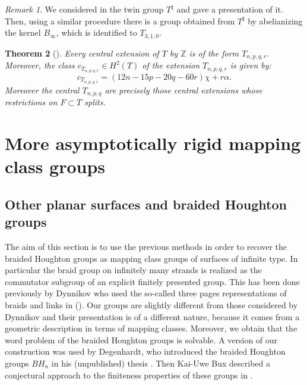 \documentclass[twoside]{irmaems}
\theoremstyle{plain}
\newtheorem{theorem}{Theorem}[section]
\theoremstyle{definition}
\theoremstyle{remark}
\newtheorem{remark}[theorem]{Remark}
\newcommand{\Z}{{\mathbb{Z}}}
\begin{document}
\begin{remark} 
We considered in \cite{fu-ka2} the twin group $T^{\sharp}$ 
and gave a presentation 
of it.  Then, using a similar procedure there is a group obtained from 
$T^{\sharp}$ 
by abelianizing the kernel $B_{\infty}$, which is identified  
to $T_{3,1,0}$. 
\end{remark}



\begin{theorem}[\cite{fu-se}]\label{exte0}
Every central extension of $T$ by $\Z$ is of the form $T_{n,p,q,r}$. Moreover,   
the class $c_{T_{n,p,q,r}}\in H^2(T)$ of the extension $T_{n,p,q,r}$  
is given by:  
\[ c_{T_{n,p,q,r}}= (12n-15p-20q-60r) \chi + r \alpha. \]
Moreover the central $T_{n,p,q}$ are precisely those central extensions 
whose restrictions on $F\subset T$ splits. 
\end{theorem}	




 
 






\section{More asymptotically rigid mapping class groups}

\subsection{Other planar surfaces and braided Houghton groups}
\vspace{0.2cm} 
\noindent 
The aim of this section is to use the previous methods  
in order to recover the braided Houghton groups as mapping class groups  
of surfaces of infinite type. In particular the braid group on infinitely 
many strands is realized as the commutator subgroup of an explicit 
finitely presented group. This has been done previously by Dynnikov  
who used the so-called three pages representations 
of braids and links in (\cite{Dy}). Our groups are slightly 
different from those considered by Dynnikov and their presentation is 
of a different nature, because it comes from a geometric description 
in terms of mapping classes. Moreover, we obtain that the word problem of the 
braided Houghton groups is solvable.  
A version of our construction was used by Degenhardt, who  
introduced the braided Houghton groups $BH_n$ in his 
(unpublished) thesis \cite{Deg}.  Then Kai-Uwe Bux described 
a conjectural approach to the finiteness properties of these 
groups in \cite{Bux}. 
\end{document}
